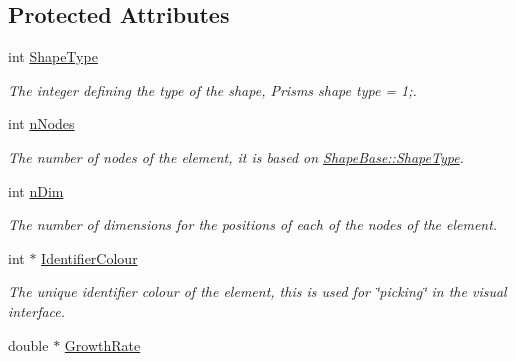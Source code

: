 \subsection*{Protected Attributes}
\begin{DoxyCompactItemize}
\item 
\hypertarget{classShapeBase_a36aedd41e8465a186a0b0c454b5b76f3}{}int \hyperlink{classShapeBase_a36aedd41e8465a186a0b0c454b5b76f3}{Shape\+Type}\label{classShapeBase_a36aedd41e8465a186a0b0c454b5b76f3}

\begin{DoxyCompactList}\small\item\em The integer defining the type of the shape, Prisms shape type = 1;. \end{DoxyCompactList}\item 
\hypertarget{classShapeBase_ae7dd93b58b3281ce90025f83d0f0e976}{}int \hyperlink{classShapeBase_ae7dd93b58b3281ce90025f83d0f0e976}{n\+Nodes}\label{classShapeBase_ae7dd93b58b3281ce90025f83d0f0e976}

\begin{DoxyCompactList}\small\item\em The number of nodes of the element, it is based on \hyperlink{classShapeBase_a36aedd41e8465a186a0b0c454b5b76f3}{Shape\+Base\+::\+Shape\+Type}. \end{DoxyCompactList}\item 
\hypertarget{classShapeBase_a250bd3396546342c8104f5b9c180d18f}{}int \hyperlink{classShapeBase_a250bd3396546342c8104f5b9c180d18f}{n\+Dim}\label{classShapeBase_a250bd3396546342c8104f5b9c180d18f}

\begin{DoxyCompactList}\small\item\em The number of dimensions for the positions of each of the nodes of the element. \end{DoxyCompactList}\item 
\hypertarget{classShapeBase_a02035767d6d169d4a2c1db5f6af8a218}{}int $\ast$ \hyperlink{classShapeBase_a02035767d6d169d4a2c1db5f6af8a218}{Identifier\+Colour}\label{classShapeBase_a02035767d6d169d4a2c1db5f6af8a218}

\begin{DoxyCompactList}\small\item\em The unique identifier colour of the element, this is used for \char`\"{}picking\char`\"{} in the visual interface. \end{DoxyCompactList}\item 
\hypertarget{classShapeBase_ae31d7545110fd505629592348a2951b7}{}double $\ast$ \hyperlink{classShapeBase_ae31d7545110fd505629592348a2951b7}{Growth\+Rate}\label{classShapeBase_ae31d7545110fd505629592348a2951b7}


\end{DoxyCompactItemize}
